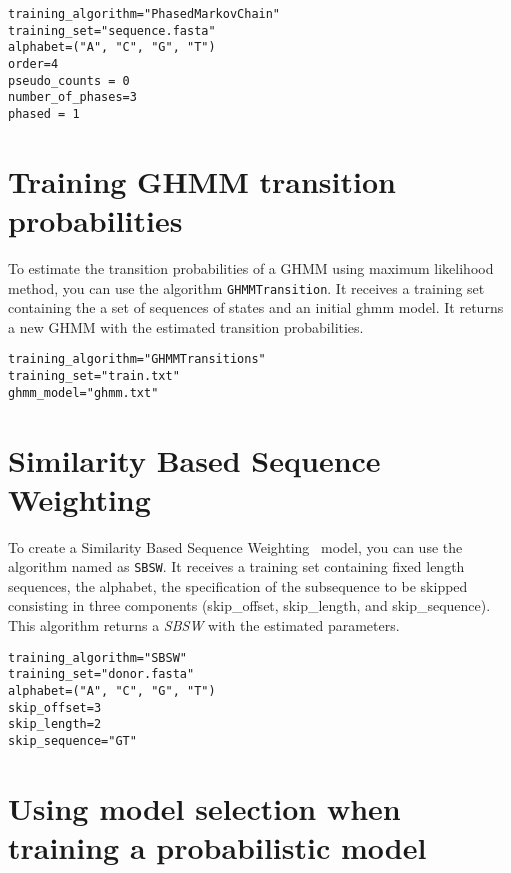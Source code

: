 \begin{Verbatim}[frame=single, label=train.txt]
training_algorithm="PhasedMarkovChain"
training_set="sequence.fasta"
alphabet=("A", "C", "G", "T")
order=4
pseudo_counts = 0
number_of_phases=3
phased = 1
\end{Verbatim}


\section{Training  GHMM transition probabilities}

To estimate the transition probabilities of a GHMM using maximum likelihood method, you can use the algorithm \texttt{GHMMTransition}. It receives a training set containing the a set of sequences of states and an initial ghmm model. It returns a new GHMM with the estimated transition probabilities.

\begin{Verbatim}[frame=single, label=train\_transitions.txt]
training_algorithm="GHMMTransitions"
training_set="train.txt"
ghmm_model="ghmm.txt"
\end{Verbatim}
\section{Similarity Based Sequence Weighting}

To create  a  Similarity Based Sequence Weighting~\cite{Stanke2003}
model, you can use the algorithm named as \texttt{SBSW}. It receives a
training set containing fixed length sequences, the alphabet, the
specification of the subsequence to be skipped consisting in three
components (skip\_offset, skip\_length, and skip\_sequence). This
algorithm returns a \textit{SBSW} with the estimated parameters.

\begin{minipage} {\textwidth}
\begin{Verbatim}[frame=single, label=train.txt]
training_algorithm="SBSW"
training_set="donor.fasta"
alphabet=("A", "C", "G", "T")
skip_offset=3
skip_length=2
skip_sequence="GT"
\end{Verbatim}
\end{minipage}


\section{Using model selection when training a probabilistic model}


